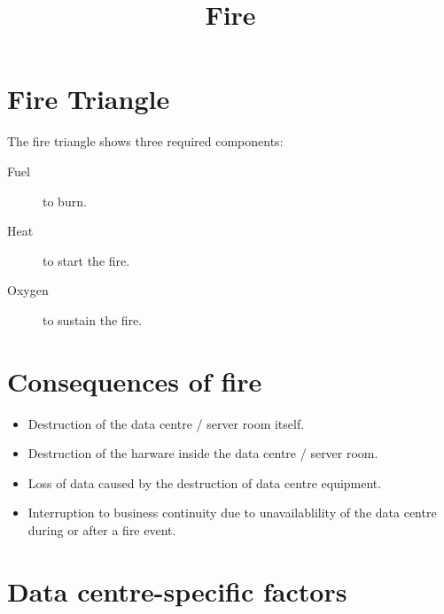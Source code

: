 \documentclass{pgnotes}
\title{Fire}
\begin{document}
\maketitle

\section{Fire Triangle}
\label{sec:fire-triangle}

The fire triangle shows three required components:

\begin{description}
\item[Fuel]
to burn.
\item[Heat]
to start the fire.
\item[Oxygen]
to sustain the fire.
\end{description}

\section{Consequences of fire}
\label{sec:consequences-of-fire}

\begin{itemize}
\item
  Destruction of the data centre / server room itself.
\item
  Destruction of the harware inside the data centre / server room.
\item
  Loss of data caused by the destruction of data centre equipment.
\item
  Interruption to business continuity due to unavailablility of the data
  centre during or after a fire event.
\end{itemize}

\section{Data centre-specific factors}
\label{sec:data-centre-specific-factors}
\end{document}
